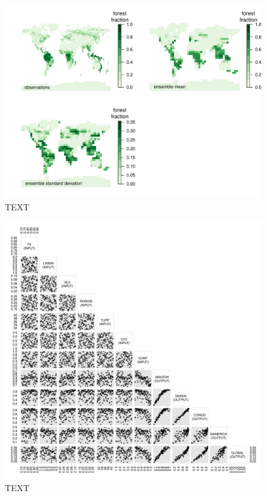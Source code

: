 \documentclass[esd, manuscript]{copernicus}
\begin{document}




\begin{figure}[t]
\includegraphics[width=12cm]{graphics/BL_obs_ensemble_mean_sd.pdf}
\caption{TEXT}
\label{fig:BL_obs_ensemble_mean_sd}
\end{figure}

\begin{figure}[t]
\includegraphics[width=12cm]{graphics/frac_pairs.pdf}
\caption{TEXT}
\label{fig:frac_pairs}
\end{figure}
\end{document}
